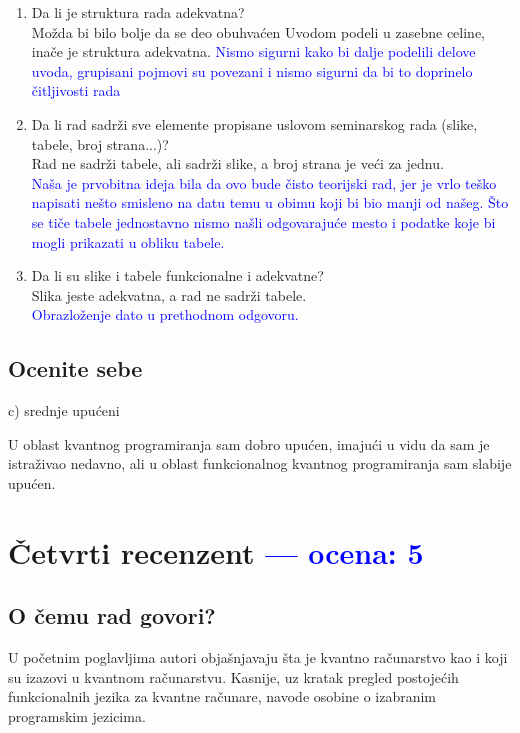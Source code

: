 \documentclass[a4paper]{report}
\newcommand{\odgovor}[1]{\textcolor{blue}{#1}}
\begin{document}
\begin{enumerate}
\item Da li je struktura rada adekvatna?\\
Možda bi bilo bolje da se deo obuhvaćen Uvodom podeli u zasebne celine, inače je struktura adekvatna.
\odgovor{Nismo sigurni kako bi dalje podelili delove uvoda, grupisani pojmovi su povezani i nismo sigurni da bi to doprinelo čitljivosti rada}
\item Da li rad sadrži sve elemente propisane uslovom seminarskog rada (slike, tabele, broj strana...)?\\
Rad ne sadrži tabele, ali sadrži slike, a broj strana je veći za jednu.\\
\odgovor {Naša je prvobitna ideja bila da ovo bude čisto teorijski rad, jer je vrlo teško napisati nešto smisleno na datu temu u obimu koji bi bio manji od našeg. Što se tiče tabele jednostavno nismo našli odgovarajuće mesto i podatke koje bi mogli prikazati u obliku tabele.}
\item Da li su slike i tabele funkcionalne i adekvatne?\\
Slika jeste adekvatna, a rad ne sadrži tabele.\\
\odgovor {Obrazloženje dato u prethodnom odgovoru.}
\end{enumerate}

\section{Ocenite sebe}
 c) srednje upućeni

U oblast kvantnog programiranja sam dobro upućen, imajući u vidu da sam je istraživao nedavno, ali u oblast funkcionalnog kvantnog programiranja sam slabije upućen.


\chapter{Četvrti recenzent \odgovor{--- ocena: 5 } }%

\section{O čemu rad govori?}
U početnim poglavljima autori objašnjavaju šta je kvantno računarstvo kao i koji su izazovi u kvantnom računarstvu. Kasnije, uz kratak pregled postojećih funkcionalnih jezika za kvantne računare, navode osobine o izabranim programskim jezicima.
\end{document}

